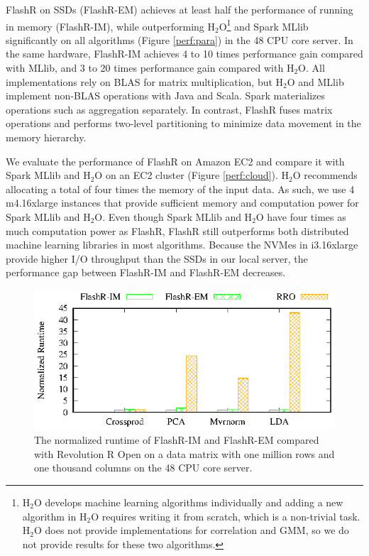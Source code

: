 FlashR on SSDs (FlashR-EM) achieves at least half the performance of
running in memory (FlashR-IM), while outperforming H$_2$O\footnote{
H$_2$O develops machine learning algorithms individually and adding
a new algorithm in H$_2$O requires writing it from scratch, which is
a non-trivial task. H$_2$O does not provide implementations for correlation
and GMM, so we do not provide results for these two algorithms.}
and Spark MLlib significantly on all algorithms
(Figure \ref{perf:para}) in the 48 CPU core server.
In the same hardware, FlashR-IM achieves 4 to 10 times
performance gain compared
with MLlib, and 3 to 20 times performance gain compared with H$_2$O.
All implementations rely on BLAS for matrix multiplication, but H$_2$O
and MLlib implement non-BLAS operations with Java and Scala.
Spark materializes operations such as aggregation separately. In contrast,
FlashR fuses matrix operations and performs two-level partitioning to
minimize data movement in the memory hierarchy.

We evaluate the performance of FlashR on Amazon EC2 and compare it
with Spark MLlib and H$_2$O on an EC2 cluster (Figure \ref{perf:cloud}). H$_2$O
recommends
allocating a total of four times the memory of the input data. As such, we use
4 m4.16xlarge instances that provide sufficient memory and computation power for
Spark MLlib and H$_2$O.
Even though Spark MLlib and H$_2$O have four times as much computation power as FlashR,
FlashR still outperforms both distributed machine learning libraries in most algorithms.
Because the NVMes in i3.16xlarge provide higher I/O throughput than the SSDs
in our local server, the performance gap between FlashR-IM and FlashR-EM decreases.

\begin{figure}
	\begin{center}
		\footnotesize
		\includegraphics{FlashMatrix_figs/FlashR-vs-RRO.eps}
		\vspace{-10pt}
		\caption{The normalized runtime of FlashR-IM and FlashR-EM
		compared with Revolution R Open on a data matrix with one million rows
		and one thousand columns on the 48 CPU core server.}
		\label{fig:fmR}
	\end{center}
\end{figure}

